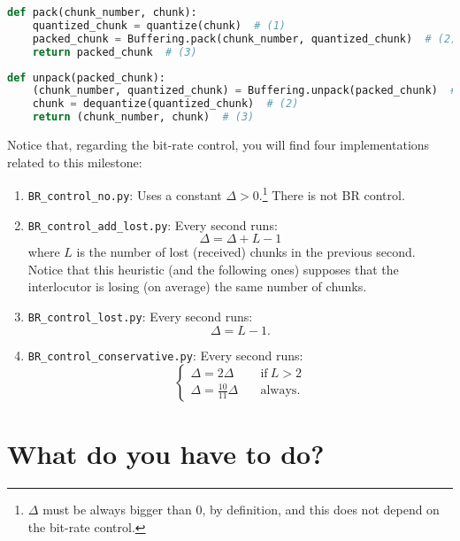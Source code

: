 \begin{lstlisting}[language=Python]
  def pack(chunk_number, chunk):
    quantized_chunk = quantize(chunk)  # (1)
    packed_chunk = Buffering.pack(chunk_number, quantized_chunk)  # (2)
    return packed_chunk  # (3)
\end{lstlisting}

\begin{lstlisting}[language=Python]
  def unpack(packed_chunk):
    (chunk_number, quantized_chunk) = Buffering.unpack(packed_chunk)  # (1)
    chunk = dequantize(quantized_chunk)  # (2)
    return (chunk_number, chunk)  # (3)
\end{lstlisting}

Notice that, regarding the bit-rate control, you will find four
implementations related to this milestone:
\begin{enumerate}
\item \verb|BR_control_no.py|: Uses a constant
  $\Delta>0$.\footnote{$\Delta$ must be always bigger than $0$, by
definition, and this does not depend on the bit-rate control.} There
  is not BR control.
\item \verb|BR_control_add_lost.py|: Every second runs:
  \begin{equation}
    \Delta = \Delta + L - 1
  \end{equation}
  where $L$ is the number of lost (received) chunks in the previous
  second. Notice that this heuristic (and the following ones) supposes
  that the interlocutor is losing (on average) the same number of
  chunks.
\item \verb|BR_control_lost.py|: Every second runs:
  \begin{equation}
    \Delta = L - 1.
  \end{equation}
\item \verb|BR_control_conservative.py|: Every second runs:
  \begin{equation}
    \left\{
    \begin{array}{ll}
      \Delta = 2\Delta & \quad\text{if}~L>2 \\
      \Delta = \frac{10}{11}\Delta & \quad\text{always}.
    \end{array}
    \right.
  \end{equation}
\end{enumerate}


\section{What do you have to do?}

